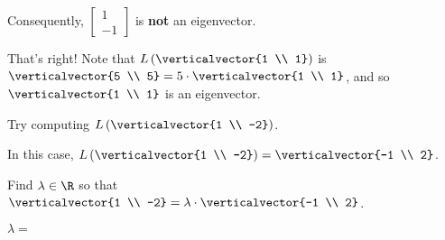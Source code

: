 \documentclass{ximera}
\begin{document}
\begin{question}
\begin{solution}
\begin{hint}
\begin{question}
        \begin{solution}
          \begin{multiple-choice}
          \end{multiple-choice}
        \end{solution}

        Consequently,  $\begin{bmatrix} 1 \\ -1 \end{bmatrix}$ is \textbf{not} an eigenvector.
      \end{question}
    \end{hint}

    \begin{multiple-choice}
    \end{multiple-choice}
  \end{solution}
  
  That's right!  Note that $L\left( \verticalvector{1 \\ 1} \right)$ is
  $\verticalvector{5 \\ 5} = 5 \cdot \verticalvector{1 \\ 1}$, and so
  $\verticalvector{1 \\ 1}$ is an eigenvector.

  \begin{solution}
    \begin{hint}
      Try computing $L\left( \verticalvector{1 \\ -2} \right)$.
    \end{hint}

    \begin{hint}
      In this case, $L\left( \verticalvector{1 \\ -2} \right) = \verticalvector{-1 \\ 2}$.
    \end{hint}

    \begin{hint}
      \begin{question}
        Find $\lambda \in \R$ so that $\verticalvector{1 \\ -2} = \lambda \cdot \verticalvector{-1 \\ 2}$.
        \begin{solution}
          $\lambda = $ 
        \end{solution}


\end{question}
\end{hint}
\end{solution}
\end{question}
\end{document}
